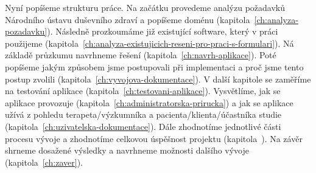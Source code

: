 Nyní popíšeme strukturu práce.
Na začátku provedeme analýzu požadavků Národního ústavu duševního zdraví a popíšeme doménu (kapitola~\ref{ch:analyza-pozadavku}).
Následně prozkoumáme již existující software, který v práci použijeme (kapitola~\ref{ch:analyza-existujicich-reseni-pro-praci-s-formulari}).
Ná základě průzkumu navrhneme řešení (kapitola~\ref{ch:navrh-aplikace}).
Poté popíšeme jakým způsobem jsme postupovali při implementaci a proč jsme tento postup zvolili (kapitola~\ref{ch:vyvojova-dokumentace}).
V další kapitole se zaměříme na testování aplikace (kapitola~\ref{ch:testovani-aplikace}).
Vysvětlíme, jak se aplikace provozuje (kapitola~\ref{ch:administratorska-prirucka}) a jak se aplikace užívá z pohledu terapeta/výzkumníka a pacienta/klienta/účastníka studie (kapitola~\ref{ch:uzivatelska-dokumentace}).
Dále zhodnotíme jednotlivé části procesu vývoje a zhodnotíme celkovou úspěšnost projektu (kapitola~).
Na závěr shrneme dosažené výsledky a navrhneme možnosti dalšího vývoje (kapitola~\ref{ch:zaver}).